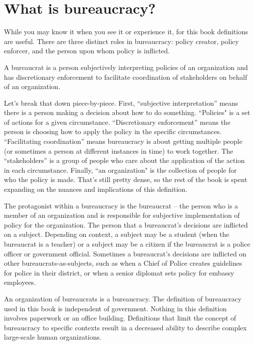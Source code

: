\section{What is bureaucracy?\label{sec:define_bureaucracy}}


While you may know it when you see it or experience it, for this book definitions are useful. There are three distinct roles in bureaucracy: policy creator, policy enforcer, and the person upon whom policy is inflicted.

A \gls{bureaucrat} is a person subjectively interpreting policies of an organization and has discretionary enforcement to facilitate coordination of stakeholders on behalf of an organization. 

Let's break that down piece-by-piece. First, ``subjective interpretation'' means there is a person making a decision about how to do something. ``Policies" is a set of actions for a given circumstance. ``Discretionary enforcement'' means the person is choosing how to apply the policy in the specific circumstances. ``Facilitating coordination'' means bureaucracy is about getting multiple people (or sometimes a person at different instances in time) to work together. The ``stakeholders'' is a group of people who care about the application of the action in each circumstance. Finally, ``an \gls{organization}" is the collection of people for who the policy is made. That's still pretty dense, so the rest of the book is spent expanding on the nuances and implications of this definition.

The protagonist within a \gls{bureaucracy} is the \gls{bureaucrat} -- the person who is a member of an organization and is responsible for subjective implementation of policy for the organization. The person that a bureaucrat's decisions are inflicted on a \gls{subject}.  Depending on context, a subject may be a student (when the bureaucrat is a teacher) or a subject may be a citizen if the bureaucrat is a police officer or government official. Sometimes a bureaucrat's decisions are inflicted on other bureaucrats-as-subjects, such as when a Chief of Police creates guidelines for police in their district, or when a senior diplomat sets policy for embassy employees. 



An organization of bureaucrats is a \gls{bureaucracy}. The definition of bureaucracy used in this book is independent of government. Nothing in this definition involves paperwork or an office building. Definitions that limit the concept of bureaucracy to specific contexts result in a  decreased ability to describe complex large-scale human organizations. 

